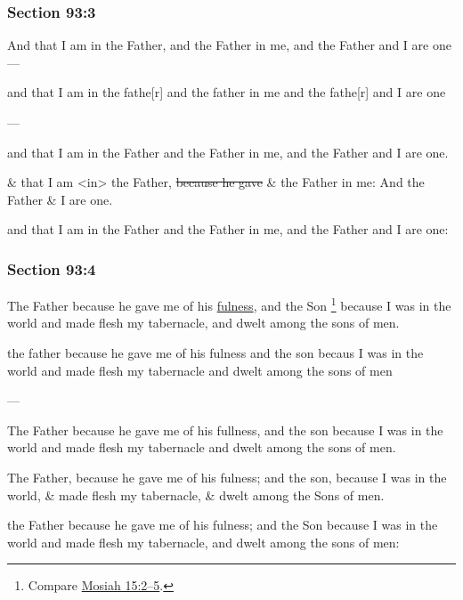 	\subsubsection{Section 93:3} %
		\label{DC93-3}

		And that I am in the Father, and the Father in me, and the Father and I are one---

		\begin{framed}
		\scriptsize
			\begin{compactdesc}
				\item[JSP] and that I am in the fathe[r] and the father in me and the fathe[r] and I are one
				\item[BC] ---
				\item[RB2] and that I am in the Father and the Father in me, and the Father and I are one.
				\item[RB1] \& that I am <in> the Father, \sout{because he gave} \& the Father in me: And the Father \& I are one. 
				\item[DC 1835] and that I am in the Father and the Father in me, and the Father and I are one: 
			\end{compactdesc}
		\end{framed}

	\subsubsection{Section 93:4} %
		\label{DC93-4}

		The Father because he gave me of his \hyperref[FULNESS]{fulness}, and the Son%
			\footnote{%
				Compare \hyperref[MOSIAH-15-2]{Mosiah 15:2--5}. 
				}
		because I was in the world and made flesh my tabernacle, and dwelt among the sons of men.

		\begin{framed}
		\scriptsize
			\begin{compactdesc}
				\item[JSP] the father because he gave me of his fulness and the son becaus I was in the world and made flesh my tabernacle and dwelt among the sons of men
				\item[BC] ---
				\item[RB2] The Father because he gave me of his fullness, and the son because I was in the world and made flesh my tabernacle and dwelt among the sons of men. 
				\item[RB1] The Father, because he gave me of his fulness; and the son, because I was in the world, \& made flesh my tabernacle, \& dwelt among the Sons of men. 
				\item[DC 1835] the Father because he gave me of his fulness; and the Son because I was in the world and made flesh my tabernacle, and dwelt among the sons of men: 
			\end{compactdesc}
		\end{framed}

